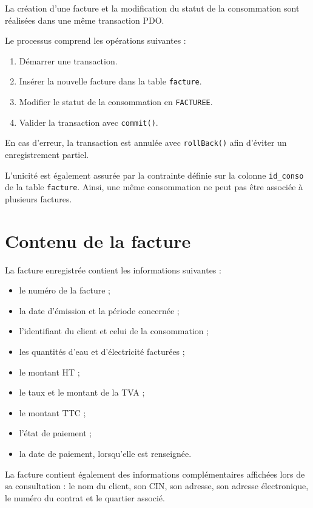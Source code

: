 La création d'une facture et la modification du statut de la consommation sont réalisées dans une même transaction PDO.

Le processus comprend les opérations suivantes :
\begin{enumerate}
    \item Démarrer une transaction.
    \item Insérer la nouvelle facture dans la table \texttt{facture}.
    \item Modifier le statut de la consommation en \texttt{FACTUREE}.
    \item Valider la transaction avec \texttt{commit()}.
\end{enumerate}

En cas d'erreur, la transaction est annulée avec \texttt{rollBack()} afin d'éviter un enregistrement partiel.

L'unicité est également assurée par la contrainte définie sur la colonne \texttt{id\_conso} de la table \texttt{facture}. Ainsi, une même consommation ne peut pas être associée à plusieurs factures.

\section{Contenu de la facture}

La facture enregistrée contient les informations suivantes :
\begin{itemize}
    \item le numéro de la facture ;
    \item la date d'émission et la période concernée ;
    \item l'identifiant du client et celui de la consommation ;
    \item les quantités d'eau et d'électricité facturées ;
    \item le montant HT ;
    \item le taux et le montant de la TVA ;
    \item le montant TTC ;
    \item l'état de paiement ;
    \item la date de paiement, lorsqu'elle est renseignée.
\end{itemize}

La facture contient également des informations complémentaires affichées lors de sa consultation : le nom du client, son CIN, son adresse, son adresse électronique, le numéro du contrat et le quartier associé.

